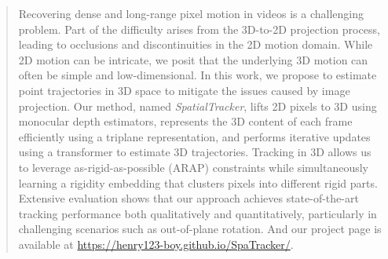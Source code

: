 \begin{abstract}
\vspace{-0.5em}

Recovering dense and long-range pixel motion in videos is a challenging problem. Part of the difficulty arises from the 3D-to-2D projection process, leading to occlusions and discontinuities in the 2D motion domain. While 2D motion can be intricate, we posit that the underlying 3D motion can often be simple and low-dimensional. In this work, we propose to estimate point trajectories in 3D space to mitigate the issues caused by image projection. Our method, named \emph{SpatialTracker}, lifts 2D pixels to 3D using monocular depth estimators, represents the 3D content of each frame efficiently using a triplane representation, and performs iterative updates using a transformer to estimate 3D trajectories. Tracking in 3D allows us to leverage as-rigid-as-possible (ARAP) constraints while simultaneously learning a rigidity embedding that clusters pixels into different rigid parts. Extensive evaluation shows that our approach achieves state-of-the-art tracking performance both qualitatively and quantitatively, particularly in challenging scenarios such as out-of-plane rotation. And our project page is available at \url{https://henry123-boy.github.io/SpaTracker/}. 



\end{abstract}
